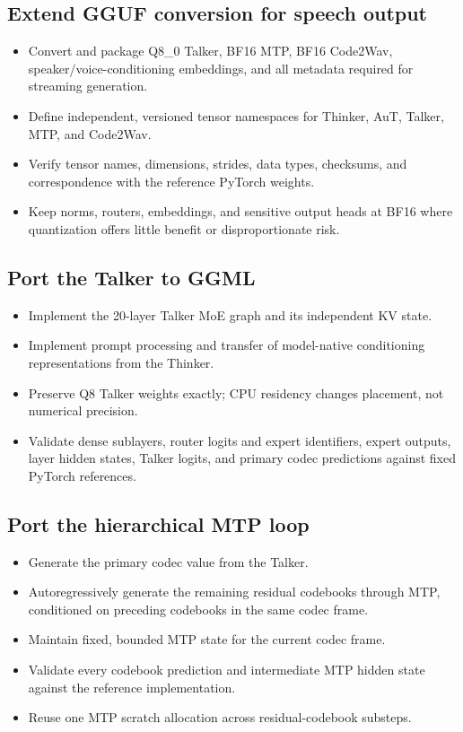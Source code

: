\documentclass[10pt,letterpaper]{article}
\begin{document}
\subsection{Extend GGUF conversion for speech output}
\begin{itemize}
    \item Convert and package Q8\_0 Talker, BF16 MTP, BF16 Code2Wav, speaker/voice-conditioning embeddings, and all metadata required for streaming generation.
    \item Define independent, versioned tensor namespaces for Thinker, AuT, Talker, MTP, and Code2Wav.
    \item Verify tensor names, dimensions, strides, data types, checksums, and correspondence with the reference PyTorch weights.
    \item Keep norms, routers, embeddings, and sensitive output heads at BF16 where quantization offers little benefit or disproportionate risk.
\end{itemize}

\subsection{Port the Talker to GGML}
\begin{itemize}
    \item Implement the 20-layer Talker MoE graph and its independent KV state.
    \item Implement prompt processing and transfer of model-native conditioning representations from the Thinker.
    \item Preserve Q8 Talker weights exactly; CPU residency changes placement, not numerical precision.
    \item Validate dense sublayers, router logits and expert identifiers, expert outputs, layer hidden states, Talker logits, and primary codec predictions against fixed PyTorch references.
\end{itemize}

\subsection{Port the hierarchical MTP loop}
\begin{itemize}
    \item Generate the primary codec value from the Talker.
    \item Autoregressively generate the remaining residual codebooks through MTP, conditioned on preceding codebooks in the same codec frame.
    \item Maintain fixed, bounded MTP state for the current codec frame.
    \item Validate every codebook prediction and intermediate MTP hidden state against the reference implementation.
    \item Reuse one MTP scratch allocation across residual-codebook substeps.
\end{itemize}
\end{document}
